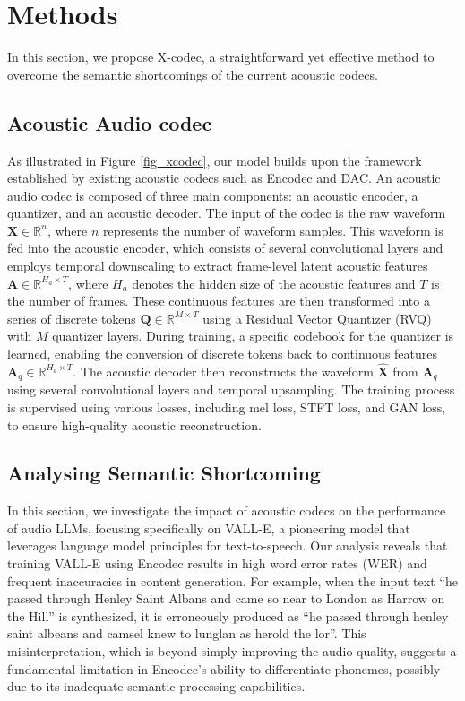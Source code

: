 \section{Methods}

In this section, we propose X-codec, a straightforward yet effective method to overcome the semantic shortcomings of the current acoustic codecs. 

\subsection{Acoustic Audio codec}

As illustrated in Figure \ref{fig_xcodec}, our model builds upon the framework established by existing acoustic codecs such as Encodec \cite{defossez2022high} and DAC\cite{kumar2024high}. An acoustic audio codec is composed of three main components: an acoustic encoder, a quantizer, and an acoustic decoder. The input of the codec is the raw waveform $\textbf{X} \in \mathbb{R}^{n}$, where $n$ represents the number of waveform samples. This waveform is fed into the acoustic encoder, which consists of several convolutional layers and employs temporal downscaling to extract frame-level latent acoustic features $\textbf{A} \in \mathbb{R}^{H_a \times T}$, where $H_a$ denotes the hidden size of the acoustic features and $T$ is the number of frames. These continuous features are then transformed into a series of discrete tokens $\textbf{Q} \in \mathbb{R}^{M \times T}$ using a Residual Vector Quantizer (RVQ) with $M$ quantizer layers. During training, a specific codebook for the quantizer is learned, enabling the conversion of discrete tokens back to continuous features $\textbf{A}_q \in \mathbb{R}^{H_a \times T}$. The acoustic decoder then reconstructs the waveform $\hat{\textbf{X}}$ from $\textbf{A}_q$ using several convolutional layers and temporal upsampling. The training process is supervised using various losses, including mel loss, STFT loss, and GAN loss, to ensure high-quality acoustic reconstruction.

\subsection{Analysing Semantic Shortcoming}

In this section, we investigate the impact of acoustic codecs on the performance of audio LLMs, focusing specifically on VALL-E, a pioneering model that leverages language model principles for text-to-speech. Our analysis reveals that training VALL-E using Encodec results in high word error rates (WER) and frequent inaccuracies in content generation. For example, when the input text ``he passed through Henley Saint Albans and came so near to London as Harrow on the Hill'' is synthesized, it is erroneously produced as ``he passed through henley saint albeans and camsel knew to lunglan as herold the lor''. This misinterpretation, which is beyond simply improving the audio quality, suggests a fundamental limitation in Encodec's ability to differentiate phonemes, possibly due to its inadequate semantic processing capabilities.

